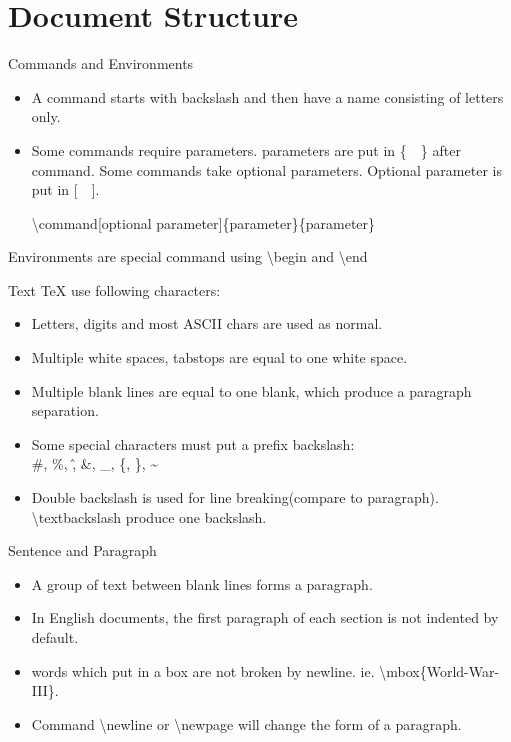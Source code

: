 \documentclass[10pt]{beamer}
\begin{document}
\section{Document Structure}
\begin{frame}{Commands and Environments}
\begin{itemize}
    \item A command starts with backslash and then have a name
        consisting of letters only.
    \item Some commands require parameters. parameters are put in 
        \{\ \ \} after command. Some commands take optional parameters.
        Optional parameter is put in [\ \ ].


        \textbackslash command[optional parameter]\{parameter\}\{parameter\}
\end{itemize}

Environments are special command using \textbackslash begin
    and \textbackslash end

\end{frame}

\begin{frame}{Text}
    \TeX{} use following characters:
\begin{itemize}
    \item Letters, digits and most ASCII chars are used as normal.
    \item Multiple white spaces, tabstops are equal to one white space.
    \item Multiple blank lines are equal to one blank, which produce
        a paragraph separation.
    \item Some special characters must put a prefix backslash:\\
        \#, \%, \^, \&, \_, \{, \}, \~{}
    \item Double backslash is used for line breaking(compare to paragraph).
        \alert{\textbackslash textbackslash} produce one backslash.
\end{itemize}
\end{frame}

\begin{frame}{Sentence and Paragraph}
\begin{itemize}
    \item A group of text between blank lines forms a paragraph.
    \item In English documents, the first paragraph of each section
        is not indented by default.
    \item words which put in a box are not broken by newline. ie.
        \textbackslash mbox\{World-War-III\}.
    \item Command \alert{\textbackslash newline} or
        \alert{\textbackslash newpage} will change the form of a paragraph.
\end{itemize}
\end{frame}
\end{document}
